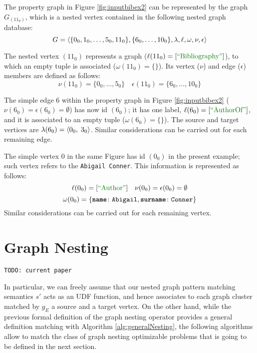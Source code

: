 \begin{example}[label=exImpl]
	The property graph in Figure \ref{fig:inputbibex2} can be represented by the graph $G_{({{11}_0})}$, which is a nested vertex contained in the following nested graph database:
	\[G=\Braket{\{0_0,1_0,\dots,5_0,11_0\}, \{6_0,\dots, 10_0\},\lambda,\ell,\omega,\nu,\epsilon}\]
	
	The nested vertex $({{11}_0})$  represents a  graph ($\ell({{11}_0})=[\mstr{Bibliography}]$), to which an empty tuple is associated ($\omega({{11}_0})=\{\}$). Its vertex ($\nu$) and edge ($\epsilon$) members are defined as follows:
	\[\nu({{11}_0})=\{{{0}_0},\dots,{{5}_0}\}\quad\epsilon({{11}_0})=\{{{6}_0},\dots,{{10}_0}\}\]
	
	The simple edge $6$ within the property graph in Figure \ref{fig:inputbibex2} ($\nu({{6}_0})=\epsilon({{6}_0})=\emptyset$) has now id $({{6}_0})$; it has one label, $\ell({{6}_0})=[\mstr{AuthorOf}]$, and it is associated to an empty tuple ($\omega({{6}_0})=\{\}$).
	The source and target vertices are 
	$\lambda({{6}_0})=\Braket{{{0}_0},\;3_0}$. Similar considerations can be carried out for each  remaining edge.
	
	The simple vertex $0$ in the same Figure has id $({{0}_0})$ in the present example; such vertex refers to the  \texttt{Abigail Conner}. This information is represented as follows:
	\[\ell({{0}_0})=[\mstr{Author}]\quad\nu({{0}_0})=\epsilon({{0}_0})=\emptyset\] \[\omega({{0}_0})=\{\texttt{\textbf{name}}\colon\texttt{Abigail},\texttt{\textbf{surname}}\colon\texttt{Conner}\}\]
	Similar considerations can be carried out for each remaining vertex.
	
\end{example}


\section{Graph Nesting}\label{sec:nestingdef}
\texttt{TODO: current paper}



In particular, we can freely assume that our nested graph pattern matching semantics $s'$ acts as an UDF function, and hence associates to each graph cluster matched by $g_E$ a source and a target vertex. On the other hand, while the previous formal definition of the graph nesting operator provides a general definition matching with Algorithm \vref{alg:generalNesting}, the following  algorithms allow to match the class of graph nesting optimizable problems that is going to be defined in the next section.